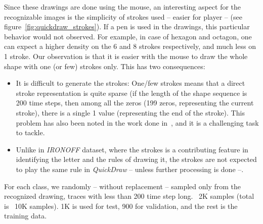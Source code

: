 \par Since these drawings are done using the mouse, an interesting aspect for the recognizable images is the simplicity of strokes used -- easier for player -- (see figure~\ref{fig:quickdraw_strokes}). If a pen is used in the drawings, this particular behavior would not observed. For example, in case of hexagon and octagon, one can expect a higher density on the 6 and 8 strokes respectively, and much less on 1 stroke. Our observation is that it is easier with the mouse to draw the whole shape with one (or few) strokes only. This has two consequences:
\begin{itemize}[noitemsep]
    \item It is difficult to generate the strokes: One/few strokes means that a direct stroke representation is quite sparse (if the length of the shape sequence is 200 time steps, then among all the zeros (199 zeros, representing the current stroke), there is a single 1 value (representing the end of the stroke). This problem has also been noted in the work done in~\citep{ha2017neural}, and it is a challenging task to tackle.
    \item Unlike in \textit{IRONOFF} dataset, where the strokes is a contributing feature in identifying the letter and the rules of drawing it, the strokes are not expected to play the same rule in \textit{QuickDraw} -- unless further processing is done --.
\end{itemize}

\par For each class, we randomly -- without replacement -- sampled only from the recognized drawing, traces with less than 200 time step long. ~2K samples (total is ~10K samples). 1K is used for test, 900 for validation, and the rest is the training data.

